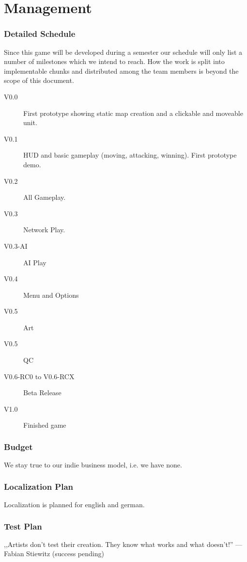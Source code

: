 \part{Management}
\section{Detailed Schedule}
Since this game will be developed during a semester our schedule will only list
a number of milestones which we intend to reach. How the work is split into implementable
chunks and distributed among the team members is beyond the scope of this document.
\label{timetable}
\begin{description}
    \item[V0.0] First prototype showing static map creation and a clickable and moveable unit.
    \item[V0.1] HUD and basic gameplay (moving, attacking, winning). First prototype demo.
    \item[V0.2] All Gameplay.
    \item[V0.3] Network Play.
    \item[V0.3-AI] AI Play
    \item[V0.4] Menu and Options
    \item[V0.5] Art
    \item[V0.5] QC
    \item[V0.6-RC0 to V0.6-RCX] Beta Release
    \item[V1.0] Finished game
\end{description}
\section{Budget}
We stay true to our indie business model, i.e. we have none.
\section{Localization Plan}
Localization is planned for english and german.
\section{Test Plan}
,,Artists don't test their creation. They know what works and what doesn't!'' --- Fabian Stiewitz (success pending)
